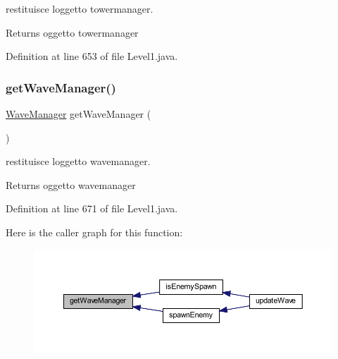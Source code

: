 restituisce l\textquotesingle{}oggetto towermanager. 

\begin{DoxyReturn}{Returns}
oggetto towermanager 
\end{DoxyReturn}


Definition at line 653 of file Level1.\+java.

\mbox{\label{classscenes_1_1_level1_a6b0fc6fbe769f38b9418fbaa51214735}} 
\subsubsection{\texorpdfstring{get\+Wave\+Manager()}{getWaveManager()}}
{\footnotesize\ttfamily \hyperlink{classmanagers_1_1_wave_manager}{Wave\+Manager} get\+Wave\+Manager (\begin{DoxyParamCaption}{ }\end{DoxyParamCaption})}



restituisce l\textquotesingle{}oggetto wavemanager. 

\begin{DoxyReturn}{Returns}
oggetto wavemanager 
\end{DoxyReturn}


Definition at line 671 of file Level1.\+java.

Here is the caller graph for this function\+:\nopagebreak
\begin{figure}[H]
\begin{center}
\leavevmode
\includegraphics[width=350pt]{classscenes_1_1_level1_a6b0fc6fbe769f38b9418fbaa51214735_icgraph}
\end{center}
\end{figure}
\mbox{\label{classscenes_1_1_level1_aded9c531b53772fd90d09a8b6bf0132e}} 
